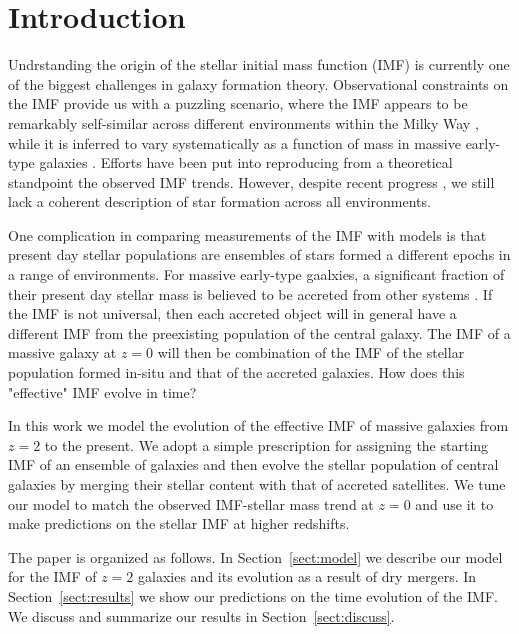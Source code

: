 \documentclass[usenatbib, letters]{mnras}
\def\Sref#1{Section~\ref{#1}\xspace}
\begin{document}
\section{Introduction}\label{sect:intro}

Undrstanding the origin of the stellar initial mass function (IMF) is currently one of the biggest challenges in galaxy formation theory.
Observational constraints on the IMF provide us with a puzzling scenario, where the IMF appears to be remarkably self-similar across different environments within the Milky Way \citep[see e.g.][]{BCM10}, while it is inferred to vary systematically as a function of mass in massive early-type galaxies \citep{Tre++10,Cap++12,CvD12,Spi++14}.
Efforts have been put into reproducing from a theoretical standpoint the observed IMF trends. However, despite recent progress \citep{H+C11,Kru11,Hop12,GKH15}, we still lack a coherent description of star formation across all environments.

One complication in comparing measurements of the IMF with models is that present day stellar populations are ensembles of stars formed a different epochs in a range of environments.
For massive early-type gaalxies, a significant fraction of their present day stellar mass is believed to be accreted from other systems \citep{vDo++10}.
If the IMF is not universal, then each accreted object will in general have a different IMF from the preexisting population of the central galaxy.
The IMF of a massive galaxy at $z=0$ will then be combination of the IMF of the stellar population formed in-situ and that of the accreted galaxies.
How does this "effective" IMF evolve in time?

In this work we model the evolution of the effective IMF of massive galaxies from $z=2$ to the present.
We adopt a simple prescription for assigning the starting IMF of an ensemble of galaxies and then evolve the stellar population of central galaxies by merging their stellar content with that of accreted satellites.
We tune our model to match the observed IMF-stellar mass trend at $z=0$ and use it to make predictions on the stellar IMF at higher redshifts.

The paper is organized as follows.  In \Sref{sect:model} we describe our model for the IMF of $z=2$ galaxies and its evolution as a result of dry mergers.
In \Sref{sect:results} we show our predictions on the time evolution of the IMF.
We discuss and summarize our results in \Sref{sect:discuss}.

\end{document}
